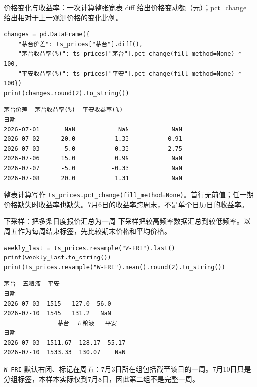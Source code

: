\documentclass[9pt]{ctexbeamer}
\begin{document}
\begin{frame}[fragile]{价格变化与收益率：一次计算整张宽表}
\small diff 给出价格变动额（元）；pct\_change 给出相对于上一观测价格的变化比例。
\medskip
\begin{lstlisting}
changes = pd.DataFrame({
    "茅台价差": ts_prices["茅台"].diff(),
    "茅台收益率(%)": ts_prices["茅台"].pct_change(fill_method=None) * 100,
    "平安收益率(%)": ts_prices["平安"].pct_change(fill_method=None) * 100})
print(changes.round(2).to_string())
\end{lstlisting}
\begin{lstlisting}[language={},numbers=none,basicstyle=\ttfamily\scriptsize]
            茅台价差  茅台收益率(%)  平安收益率(%)
日期
2026-07-01       NaN            NaN            NaN
2026-07-02      20.0           1.33          -0.91
2026-07-03      -5.0          -0.33           2.75
2026-07-06      15.0           0.99            NaN
2026-07-07      -5.0          -0.33            NaN
2026-07-08      20.0           1.31            NaN
\end{lstlisting}
\small 整表计算写作 \texttt{ts\_prices.pct\_change(fill\_method=None)}。首行无前值；任一期价格缺失时收益率也缺失。7月6日的收益率跨周末，不是单个日历日的收益率。
\end{frame}

\begin{frame}[fragile]{下采样：把多条日度报价汇总为一周}
\small 下采样把较高频率数据汇总到较低频率。以周五作为每周结束标签，先比较期末价格和平均价格。
\medskip
\begin{lstlisting}
weekly_last = ts_prices.resample("W-FRI").last()
print(weekly_last.to_string())
print(ts_prices.resample("W-FRI").mean().round(2).to_string())
\end{lstlisting}
\begin{lstlisting}[language={},numbers=none,basicstyle=\ttfamily\scriptsize]
            茅台  五粮液  平安
日期
2026-07-03  1515   127.0  56.0
2026-07-10  1545   131.2   NaN
               茅台  五粮液   平安
日期
2026-07-03  1511.67  128.17  55.17
2026-07-10  1533.33  130.07    NaN
\end{lstlisting}
\small \texttt{W-FRI} 默认右闭、标记在周五：7月3日所在组包括截至该日的一周。7月10日只是分组标签，本样本实际仅到7月8日，因此第二组不是完整一周。
\end{frame}
\end{document}
